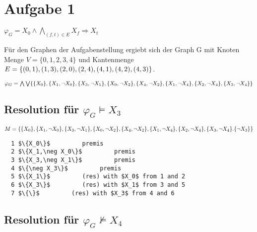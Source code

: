 \section*{Aufgabe 1}

$\varphi_G = X_0 \wedge \bigwedge\limits_{(f,t) \in E} X_f \Rightarrow X_t$

Für den Graphen der Aufgabenstellung ergiebt sich 
der Graph G mit Knoten Menge $V = \{0,1,2,3,4\}$ und Kantenmenge  $E = \\ \{(0,1),(1,3),(2,0),(2,4),(4,1),(4,2),(4,3)\} $.


$\varphi_G = \bigwedge\bigvee \{\{X_0\}
,\{X_1,\neg X_0\} 
,\{X_3,\neg X_1\} 
,\{X_0,\neg X_2\} \\
,\{X_4,\neg X_2\}
,\{X_1,\neg X_4\}
,\{X_2,\neg X_4\}
,\{X_3,\neg X_4\}
\}$

\subsection*{Resolution für $\varphi_G \vDash X_3$}

$M = \{\{X_0\}
,\{X_1,\neg X_0\} 
,\{X_3,\neg X_1\} 
,\{X_0,\neg X_2\} \\
,\{X_4,\neg X_2\}
,\{X_1,\neg X_4\}
,\{X_2,\neg X_4\}
,\{X_3,\neg X_4\}
.\{\neg X_3\}
\}$

\begin{lstlisting}
  1 $\{X_0\}$         premis 
  2 $\{X_1,\neg X_0\}$         premis
  3 $\{X_3,\neg X_1\}$         premis
  4 $\{\neg X_3\}$         premis
  5 $\{X_1\}$         (res) with $X_0$ from 1 and 2
  6 $\{X_3\}$         (res) with $X_1$ from 3 and 5
  7 $\{\}$         (res) with $X_3$ from 4 and 6
\end{lstlisting}


\subsection*{Resolution für $\varphi_G \not\vDash X_4 $} 


